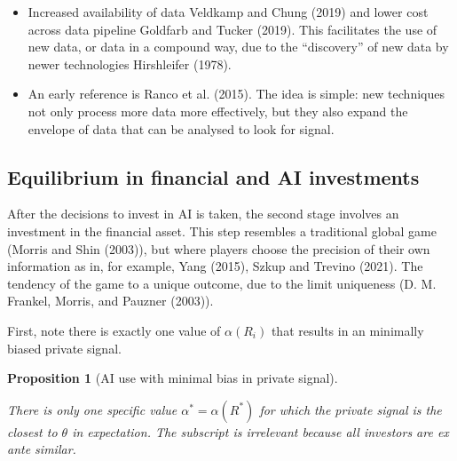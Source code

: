 \documentclass[
]{article}
\theoremstyle{plain}
\newtheorem{proposition}{Proposition}[section]
\theoremstyle{remark}
\begin{document}
\begin{itemize}
\item
  Increased availability of data Veldkamp and Chung (2019) and lower
  cost across data pipeline Goldfarb and Tucker (2019). This facilitates
  the use of new data, or data in a compound way, due to the
  ``discovery'' of new data by newer technologies Hirshleifer (1978).
\item
  An early reference is Ranco et al. (2015). The idea is simple: new
  techniques not only process more data more effectively, but they also
  expand the envelope of data that can be analysed to look for signal.
\end{itemize}

\subsection{Equilibrium in financial and AI
investments}\label{equilibrium-in-financial-and-ai-investments}

After the decisions to invest in AI is taken, the second stage involves
an investment in the financial asset. This step resembles a traditional
global game (Morris and Shin (2003)), but where players choose the
precision of their own information as in, for example, Yang (2015),
Szkup and Trevino (2021). The tendency of the game to a unique outcome,
due to the limit uniqueness (D. M. Frankel, Morris, and Pauzner (2003)).

First, note there is exactly one value of \(\alpha(R_i)\) that results
in an minimally biased private signal.

\begin{proposition}[AI use with minimal bias in private
signal]\protect\hypertarget{prp-alphainvestunbiased}{}\label{prp-alphainvestunbiased}

There is only one specific value \(\alpha^* = \alpha(R^*)\) for which
the private signal is the closest to \(\theta\) in expectation. The
subscript is irrelevant because all investors are ex ante similar.

\end{proposition}
\end{document}
